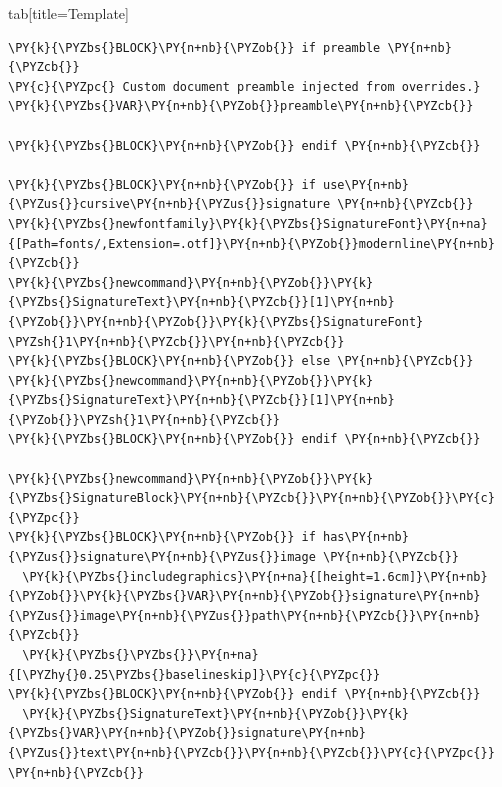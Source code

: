 \documentclass[a4paper,twoside]{article}
\begin{document}
\begin{tsdiv}{tab}[title=Template]
\begin{tscode}[lang=latex, engine=pygments]
\begin{Verbatim}[commandchars=\\\{\},breaklines, breakanywhere, commandchars=\\\{\}]
\PY{k}{\PYZbs{}BLOCK}\PY{n+nb}{\PYZob{}} if preamble \PY{n+nb}{\PYZcb{}}
\PY{c}{\PYZpc{} Custom document preamble injected from overrides.}
\PY{k}{\PYZbs{}VAR}\PY{n+nb}{\PYZob{}}preamble\PY{n+nb}{\PYZcb{}}

\PY{k}{\PYZbs{}BLOCK}\PY{n+nb}{\PYZob{}} endif \PY{n+nb}{\PYZcb{}}

\PY{k}{\PYZbs{}BLOCK}\PY{n+nb}{\PYZob{}} if use\PY{n+nb}{\PYZus{}}cursive\PY{n+nb}{\PYZus{}}signature \PY{n+nb}{\PYZcb{}}
\PY{k}{\PYZbs{}newfontfamily}\PY{k}{\PYZbs{}SignatureFont}\PY{n+na}{[Path=fonts/,Extension=.otf]}\PY{n+nb}{\PYZob{}}modernline\PY{n+nb}{\PYZcb{}}
\PY{k}{\PYZbs{}newcommand}\PY{n+nb}{\PYZob{}}\PY{k}{\PYZbs{}SignatureText}\PY{n+nb}{\PYZcb{}}[1]\PY{n+nb}{\PYZob{}}\PY{n+nb}{\PYZob{}}\PY{k}{\PYZbs{}SignatureFont} \PYZsh{}1\PY{n+nb}{\PYZcb{}}\PY{n+nb}{\PYZcb{}}
\PY{k}{\PYZbs{}BLOCK}\PY{n+nb}{\PYZob{}} else \PY{n+nb}{\PYZcb{}}
\PY{k}{\PYZbs{}newcommand}\PY{n+nb}{\PYZob{}}\PY{k}{\PYZbs{}SignatureText}\PY{n+nb}{\PYZcb{}}[1]\PY{n+nb}{\PYZob{}}\PYZsh{}1\PY{n+nb}{\PYZcb{}}
\PY{k}{\PYZbs{}BLOCK}\PY{n+nb}{\PYZob{}} endif \PY{n+nb}{\PYZcb{}}

\PY{k}{\PYZbs{}newcommand}\PY{n+nb}{\PYZob{}}\PY{k}{\PYZbs{}SignatureBlock}\PY{n+nb}{\PYZcb{}}\PY{n+nb}{\PYZob{}}\PY{c}{\PYZpc{}}
\PY{k}{\PYZbs{}BLOCK}\PY{n+nb}{\PYZob{}} if has\PY{n+nb}{\PYZus{}}signature\PY{n+nb}{\PYZus{}}image \PY{n+nb}{\PYZcb{}}
  \PY{k}{\PYZbs{}includegraphics}\PY{n+na}{[height=1.6cm]}\PY{n+nb}{\PYZob{}}\PY{k}{\PYZbs{}VAR}\PY{n+nb}{\PYZob{}}signature\PY{n+nb}{\PYZus{}}image\PY{n+nb}{\PYZus{}}path\PY{n+nb}{\PYZcb{}}\PY{n+nb}{\PYZcb{}}
  \PY{k}{\PYZbs{}\PYZbs{}}\PY{n+na}{[\PYZhy{}0.25\PYZbs{}baselineskip]}\PY{c}{\PYZpc{}}
\PY{k}{\PYZbs{}BLOCK}\PY{n+nb}{\PYZob{}} endif \PY{n+nb}{\PYZcb{}}
  \PY{k}{\PYZbs{}SignatureText}\PY{n+nb}{\PYZob{}}\PY{k}{\PYZbs{}VAR}\PY{n+nb}{\PYZob{}}signature\PY{n+nb}{\PYZus{}}text\PY{n+nb}{\PYZcb{}}\PY{n+nb}{\PYZcb{}}\PY{c}{\PYZpc{}}
\PY{n+nb}{\PYZcb{}}


\end{Verbatim}
\end{tscode}
\end{tsdiv}
\end{document}
